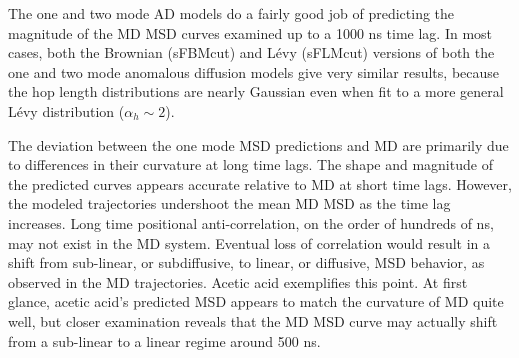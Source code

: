 \documentclass[journal=jctcce,manuscript=article]{achemso}
\begin{document}
\begin{figure}
{%
  }\label{fig:2mode_parameters}
  \end{figure} 

  The one and two mode AD models do a fairly good job of predicting the
  magnitude of the MD MSD curves examined up to a 1000 ns time lag. In most
  cases, both the Brownian (sFBMcut) and L\'evy (sFLMcut) versions of both the
  one and two mode anomalous diffusion models give very similar results, 
  because  
  the hop length distributions are nearly Gaussian even when fit to a more general
  L\'evy distribution ($\alpha_h \sim 2$). 
  
  The deviation between the one mode MSD predictions and MD are primarily due
  to differences in their curvature at long time lags. The shape and magnitude
  of the predicted curves appears accurate relative to MD at short time lags.
  However, the modeled trajectories undershoot the mean MD MSD as the time lag
  increases. Long time positional anti-correlation, on the order of hundreds of
  ns, may not exist in the MD system. Eventual loss of correlation would result 
  in a shift from sub-linear, or subdiffusive, to linear, or diffusive, MSD behavior, as observed in the MD 
  trajectories. Acetic acid exemplifies this point. At first glance, acetic acid's
  predicted MSD appears to match the curvature of MD quite well, but closer 
  examination reveals that
  the MD MSD curve may actually shift from a sub-linear to a linear regime around
  500 ns.
  
\end{document}
